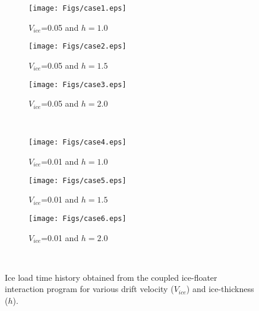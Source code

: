 \documentclass[review]{elsarticle}
\begin{document}
\begin{figure}
	\centering
	\begin{subfigure}{.33\textwidth}
		\centering
		\texttt{[image: Figs/case1.eps]}
		\caption{$V_{ice}$=0.05 and $h=1.0$}
	\end{subfigure}%
	\begin{subfigure}{.33\textwidth}
		\centering
		\texttt{[image: Figs/case2.eps]}
		\caption{$V_{ice}$=0.05 and $h=1.5$}
	\end{subfigure}
	\begin{subfigure}{.33\textwidth}
		\centering
		\texttt{[image: Figs/case3.eps]}
		\caption{$V_{ice}$=0.05 and $h=2.0$}
	\end{subfigure}\\
	\begin{subfigure}{.33\textwidth}
		\centering
		\texttt{[image: Figs/case4.eps]}
		\caption{$V_{ice}$=0.01 and $h=1.0$}
	\end{subfigure}
	\begin{subfigure}{.33\textwidth}
		\centering
		\texttt{[image: Figs/case5.eps]}
		\caption{$V_{ice}$=0.01 and $h=1.5$}
	\end{subfigure}
	\begin{subfigure}{.32\textwidth}
		\centering
		\texttt{[image: Figs/case6.eps]}
		\caption{$V_{ice}$=0.01 and $h=2.0$}
	\end{subfigure}\\
	\caption{Ice load time history obtained from the coupled ice-floater interaction program for various drift velocity ($V_{ice}$) and ice-thickness ($h$). }\label{IL}
	\end{figure}

\end{document}
